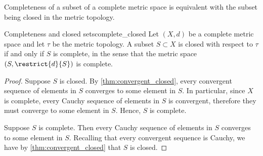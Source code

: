 Completeness of a subset of a complete metric space is equivalent with the subset being closed in the metric topology.
\begin{theorem}{Completeness and closed sets}{complete_closed}
    Let \((X, d)\) be a complete metric space and let \(\tau\) be the metric topology. A subset \(S \subset X\) is closed with respect to \(\tau\) if and only if \(S\) is complete, in the sense that the metric space \((S, \restrict{d}{S})\) is complete.
\end{theorem}
\begin{proof}
    Suppose \(S\) is closed. By \cref{thm:convergent_closed}, every convergent sequence of elements in \(S\) converges to some element in \(S\). In particular, since \(X\) is complete, every Cauchy sequence of elements in \(S\) is convergent, therefore they must converge to some element in \(S\). Hence, \(S\) is complete.

    Suppose \(S\) is complete. Then every Cauchy sequence of elements in \(S\) converges to some element in \(S\). Recalling that every convergent sequence is Cauchy, we have by \cref{thm:convergent_closed} that \(S\) is closed.
\end{proof}

